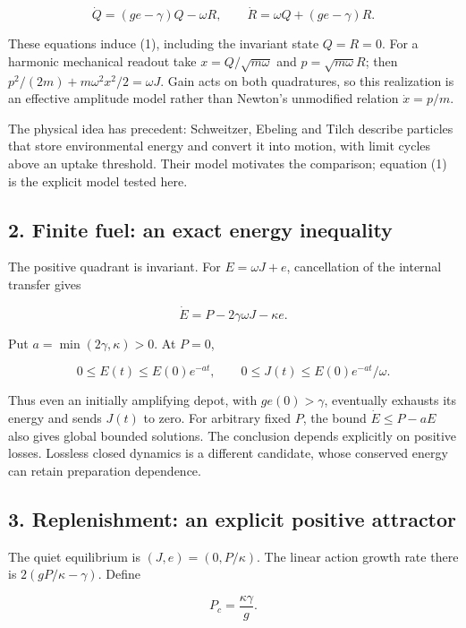 \documentclass[11pt,a4paper]{article}
\begin{document}
\[\dot Q=(ge-\gamma)Q-\omega R,\qquad
\dot R=\omega Q+(ge-\gamma)R.\]

These equations induce (1), including the invariant state \(Q=R=0\). For
a harmonic mechanical readout take \(x=Q/\sqrt{m\omega}\) and
\(p=\sqrt{m\omega}R\); then \(p^2/(2m)+m\omega^2x^2/2=\omega J\). Gain
acts on both quadratures, so this realization is an effective amplitude
model rather than Newton's unmodified relation \(\dot x=p/m\).

The physical idea has precedent: Schweitzer, Ebeling and Tilch describe
particles that store environmental energy and convert it into motion,
with limit cycles above an uptake threshold. Their model motivates the
comparison; equation (1) is the explicit model tested here.

\hypertarget{finite-fuel-an-exact-energy-inequality}{%
\subsection{2. Finite fuel: an exact energy
inequality}\label{finite-fuel-an-exact-energy-inequality}}

The positive quadrant is invariant. For \(E=\omega J+e\), cancellation
of the internal transfer gives

\[\dot E=P-2\gamma\omega J-\kappa e. \tag{2}\]

Put \(a=\min(2\gamma,\kappa)>0\). At \(P=0\),

\[0\le E(t)\le E(0)e^{-at},\qquad
0\le J(t)\le E(0)e^{-at}/\omega. \tag{3}\]

Thus even an initially amplifying depot, with \(ge(0)>\gamma\),
eventually exhausts its energy and sends \(J(t)\) to zero. For arbitrary
fixed \(P\), the bound \(\dot E\le P-aE\) also gives global bounded
solutions. The conclusion depends explicitly on positive losses.
Lossless closed dynamics is a different candidate, whose conserved
energy can retain preparation dependence.

\hypertarget{replenishment-an-explicit-positive-attractor}{%
\subsection{3. Replenishment: an explicit positive
attractor}\label{replenishment-an-explicit-positive-attractor}}

The quiet equilibrium is \((J,e)=(0,P/\kappa)\). The linear action
growth rate there is \(2(gP/\kappa-\gamma)\). Define

\[P_c=\frac{\kappa\gamma}{g}.\]
\end{document}
